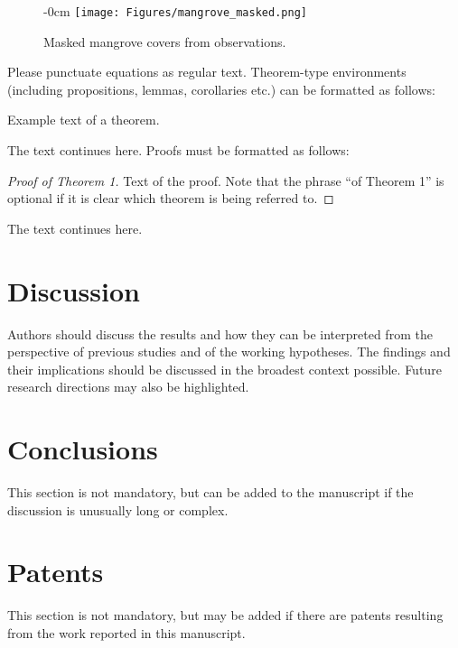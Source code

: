 \documentclass[journal,article,submit,pdftex,moreauthors]{Definitions/mdpi}
\begin{document}
\begin{figure}[H]
\begin{adjustwidth}{-\extralength}{0cm}
\centering
\texttt{[image: Figures/mangrove\_masked.png]}
\end{adjustwidth}
\caption{Masked mangrove covers from observations.\label{fig2}}
\end{figure}  

Please punctuate equations as regular text. Theorem-type environments (including propositions, lemmas, corollaries etc.) can be formatted as follows:
\begin{Theorem}
Example text of a theorem.
\end{Theorem}

The text continues here. Proofs must be formatted as follows:

\begin{proof}[Proof of Theorem 1]
Text of the proof. Note that the phrase ``of Theorem 1'' is optional if it is clear which theorem is being referred to.
\end{proof}
The text continues here.

\section{Discussion}

Authors should discuss the results and how they can be interpreted from the perspective of previous studies and of the working hypotheses. The findings and their implications should be discussed in the broadest context possible. Future research directions may also be highlighted.

\section{Conclusions}

This section is not mandatory, but can be added to the manuscript if the discussion is unusually long or complex.

\section{Patents}

This section is not mandatory, but may be added if there are patents resulting from the work reported in this manuscript.
\end{document}
